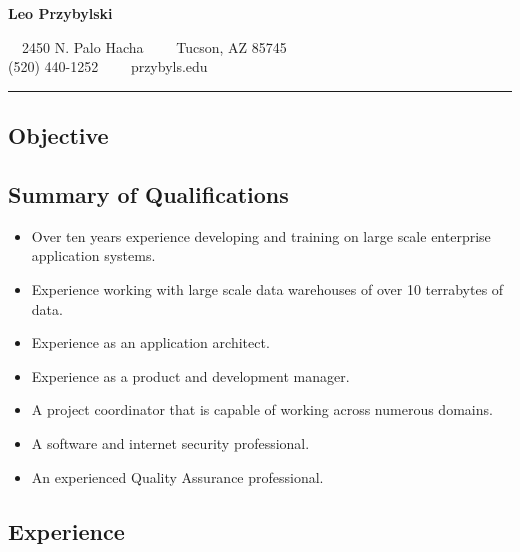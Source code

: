 \documentclass[10pt,letterpaper]{article}
\begin{document}
\begin{center}
{\LARGE \textbf{Leo Przybylski}}

\ \ 2450 N. Palo Hacha\ \ \textbullet
\ \ Tucson, AZ 85745
\\
(520) 440-1252\ \ \textbullet
\ \ przybyls\@arizona.edu
\end{center}

\hrule
\vspace{-0.4em}
\subsection*{Objective}


\subsection*{Summary of Qualifications}
\begin{itemize}
  \item Over ten years experience developing and training on large scale
enterprise application systems.
\item Experience working with large scale data warehouses of over 10
  terrabytes of data.
\item Experience as an application architect.
\item Experience as a product and development manager.
\item A project coordinator that is capable of working across numerous
  domains.
\item A software and internet security professional.
\item An experienced Quality Assurance professional.
\end{itemize}

\subsection*{Experience}
\end{document}
